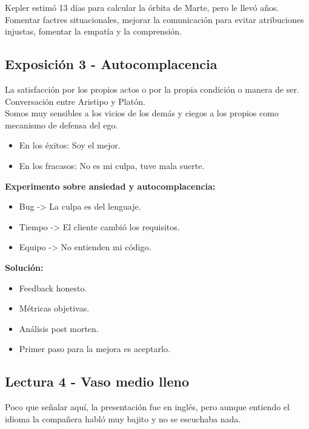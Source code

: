\documentclass[12pt, a4paper, twoside]{article}
\begin{document}
Kepler estimó 13 días para calcular la órbita de Marte, pero le llevó años.\\

Fomentar factres situacionales, mejorar la comunicación para evitar atribuciones injustas,
fomentar la empatía y la comprensión.\\

\subsection{Exposición 3 - Autocomplacencia}

La satisfacción por los propios actos o por la propia condición o manera de ser.\\
Conversación entre Aristipo y Platón.\\
Somos muy sensibles a los vicios de los demás y ciegos a los propios como mecanismo
de defensa del ego. \\
\begin{itemize}
    \item{En los éxitos: Soy el mejor.}
    \item{En los fracasos: No es mi culpa, tuve mala suerte.}
\end{itemize}
\textbf{Experimento sobre ansiedad y autocomplacencia:} 

\begin{itemize}
    \item{Bug -> La culpa es del lenguaje.}
    \item{Tiempo -> El cliente cambió los requisitos.}
    \item{Equipo -> No entienden mi código.}
\end{itemize}

\noindent\textbf{Solución:}

\begin{itemize}
    \item{Feedback honesto.}
    \item{Métricas objetivas.}
    \item{Análisis post morten.}
    \item{Primer paso para la mejora es aceptarlo.}
\end{itemize}

\subsection{Lectura 4 - Vaso medio lleno}
Poco que señalar aquí, la presentación fue en inglés, pero aunque entiendo el idioma la 
compañera habló muy bajito y no se escuchaba nada.\\
\end{document}
